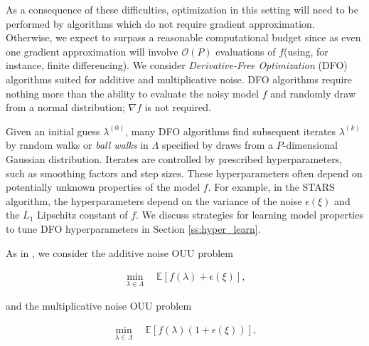 \documentclass{amsart}
\begin{document}
As a consequence of these difficulties, optimization in this setting will need to be performed by algorithms which
do not require  gradient approximation. %
Otherwise, we expect to surpass a reasonable computational budget since as even one gradient approximation will involve $\mathcal{O}(P)$  evaluations of $f$(using, for instance, finite differencing).
We consider \textit{Derivative-Free Optimization} (DFO) algorithms suited for additive and multiplicative noise. DFO algorithms require nothing more than the ability to evaluate the noisy model $f$ and randomly draw from a normal distribution; $\nabla f$ is not required. %

Given an initial guess $\lambda^{(0)}$, many DFO algorithms find subsequent iterates $\lambda^{(k)}$ by random walks or \textit{ball walks} in $\Lambda$ specified by draws from a $P$-dimensional Gaussian distribution.
Iterates are controlled by prescribed hyperparameters, such as smoothing factors and step sizes. 
These hyperparameters often depend on potentially unknown properties of the model $f$.
For example, in the STARS algorithm\cite{CW}, the hyperparameters depend on the variance of the noise $\epsilon(\xi)$ and the $L_1$ Lipschitz constant of $f$.  We discuss strategies for learning model properties to tune DFO hyperparameters in Section \ref{ss:hyper_learn}.

As in \cite{CW}, we consider the additive noise OUU problem

\begin{eqnarray} \label{eq:1}
\min_{\lambda \in \Lambda} \quad \mathbb{E}\left[f(\lambda)+\epsilon(\xi)\right],
\end{eqnarray} 

\noindent and the multiplicative noise OUU problem

\begin{eqnarray} \label{eq:2}
\min_{\lambda \in \Lambda} \quad \mathbb{E}\left[f(\lambda)(1+\epsilon(\xi))\right],
\end{eqnarray} 
\end{document}
